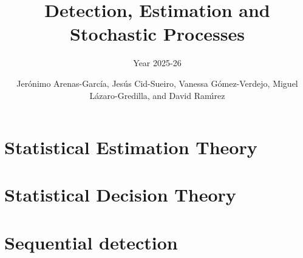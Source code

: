 \documentclass[graybox,envcountchap,sectrefs]{svmono_mod}
\begin{document}
\author{Jer\'onimo Arenas-Garc\'ia, Jes\'us Cid-Sueiro, Vanessa G\'omez-Verdejo, Miguel L\'azaro-Gredilla, and David Ram{\'\i}rez}
\title{Detection, Estimation and Stochastic Processes}
\subtitle{Year 2025-26}

\maketitle

\frontmatter

\tableofcontents

\mainmatter %


\chapter{Statistical Estimation Theory}
\label{ch:ET}

\localtableofcontents


% 









\chapter{Statistical Decision Theory}
\label{ch:SDT}

\localtableofcontents

% 


%


\chapter{Sequential detection}
\label{sec:seq_det}
\end{document}

